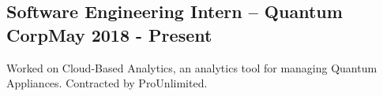 \documentclass[../Resume.tex]{subfiles}
\begin{document}
    \subsection{Software Engineering Intern -- Quantum Corp\null\hfill May 2018 - Present}
    \par Worked on Cloud-Based Analytics, an analytics tool for managing Quantum Appliances. Contracted by ProUnlimited.
    \vspace*{-2mm}
\end{document}
